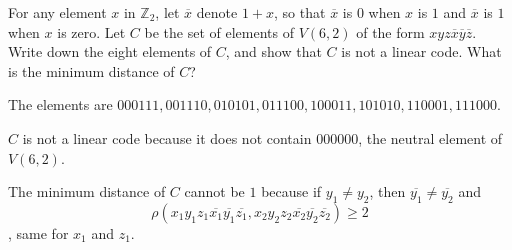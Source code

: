 \begin{exercise}
    For any element \(x\) in \(\mathbb{Z}_2\), let \(\overline x\) denote \(1 + x\), so that \(\overline{x}\) is \(0\) when \(x\) is \(1\) and \(\overline{x}\) is \(1\) when \(x\) is zero. Let \(C\) be the set of elements of \(V(6, 2)\) of the form \(xyz \overline{x} \overline{y} \overline{z}\). Write down the eight elements of \(C\), and show that \(C\) is not a linear code. What is the minimum distance of \(C\)?
\end{exercise}
\begin{solution}
    The elements are \(000111, 001110, 010101, 011100, 100011, 101010, 110001, 111000\).

    \(C\) is not a linear code because it does not contain \(000000\), the neutral element of \(V(6, 2)\).

    The minimum distance of \(C\) cannot be \(1\) because if \(y_1 \neq y_2\), then \(\overline{y_1} \neq \overline{y_2}\) and \[\rho(x_1y_1z_1 \overline{x_1} \overline{y_1} \overline{z_1}, x_2y_2z_2 \overline{x_2} \overline{y_2} \overline{z_2}) \geq 2\], same for \(x_1\) and \(z_1\).
\end{solution}

